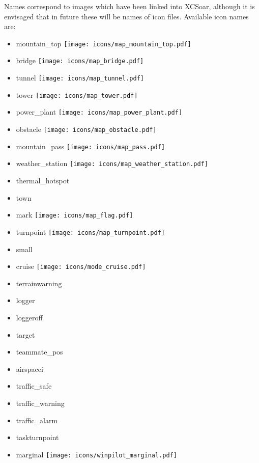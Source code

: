 Names correspond to images which have been linked into XCSoar, although
it is envisaged that in future these will be names of icon files. Available icon names are:
\begin{itemize}
\item mountain\_top \texttt{[image: icons/map\_mountain\_top.pdf]}
\item bridge \texttt{[image: icons/map\_bridge.pdf]}
\item tunnel \texttt{[image: icons/map\_tunnel.pdf]}
\item tower \texttt{[image: icons/map\_tower.pdf]}
\item power\_plant \texttt{[image: icons/map\_power\_plant.pdf]}
\item obstacle \texttt{[image: icons/map\_obstacle.pdf]}
\item mountain\_pass \texttt{[image: icons/map\_pass.pdf]}
\item weather\_station \texttt{[image: icons/map\_weather\_station.pdf]}
\item thermal\_hotspot
\item town
\item mark \texttt{[image: icons/map\_flag.pdf]}
\item turnpoint \texttt{[image: icons/map\_turnpoint.pdf]}
\item small
\item cruise \texttt{[image: icons/mode\_cruise.pdf]}
\item terrainwarning
\item logger
\item loggeroff
\item target
\item teammate\_pos
\item airspacei
\item traffic\_safe
\item traffic\_warning
\item traffic\_alarm
\item taskturnpoint
\item marginal \texttt{[image: icons/winpilot\_marginal.pdf]}

\end{itemize}
